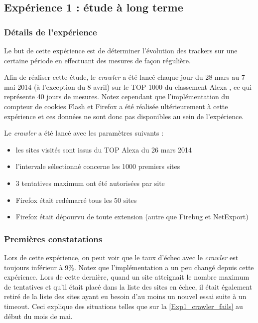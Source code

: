\subsection{Expérience 1 : étude à long terme}
\subsubsection{Détails de l'expérience}
Le but de cette expérience est de déterminer l'évolution des trackers sur une certaine période en effectuant des mesures de façon régulière.

Afin de réaliser cette étude, le \textit{crawler} a été lancé chaque jour du 28 mars au 7 mai 2014 (à l'exception du 8 avril) sur le TOP 1000 du classement Alexa \cite{AlexaTop}, ce qui représente 40 jours de mesures. Notez cependant que l'implémentation du compteur de cookies Flash et Firefox a été réalisée ultérieurement à cette expérience et ces données ne sont donc pas disponibles au sein de l'expérience.

Le \textit{crawler} a été lancé avec les paramètres suivants :
\begin{itemize}
	\item les sites visités sont issus du TOP Alexa du 26 mars 2014
	\item l'intervale sélectionné concerne les 1000 premiers sites
	\item 3 tentatives maximum ont été autorisées par site
	\item Firefox était redémarré tous les 50 sites
	\item Firefox était dépourvu de toute extension (autre que Firebug et NetExport)
	\newline
\end{itemize}

\subsubsection{Premières constatations}
Lors de cette expérience, on peut voir que le taux d'échec avec le \textit{crawler} est toujours inférieur à 9\%.
Notez que l'implémentation a un peu changé depuis cette expérience. Lors de cette dernière, quand un site atteignait le nombre maximum de tentatives et qu'il était placé dans la liste des sites en échec, il était également retiré de la liste des sites ayant eu besoin d'au moins un nouvel essai suite à un timeout.
Ceci explique des situations telles que sur la \autoref{Exp1_crawler_fails} au début du mois de mai.

